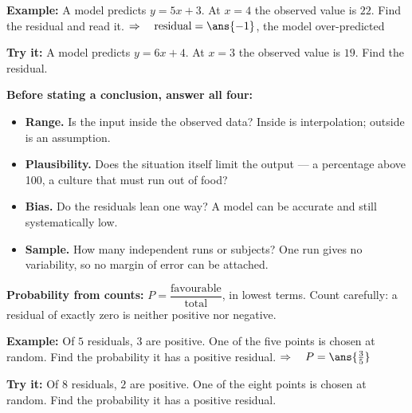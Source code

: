 \documentclass[12pt]{article}
\begin{document}
\begin{examplebox}
\textbf{Example:} \quad A model predicts $y = 5x + 3$. At $x = 4$ the observed value is
$22$. Find the residual and read it.
$\Rightarrow\quad \text{residual} = \ans{-1}$, the model over-predicted
\end{examplebox}

\begin{tryitbox}
\textbf{Try it:} \quad A model predicts $y = 6x + 4$. At $x = 3$ the observed value is
$19$. Find the residual.\\[2pt]
\end{tryitbox}


\begin{formulabox}
\textbf{Before stating a conclusion, answer all four:}
\begin{itemize}[label={$\bullet$}, leftmargin=1.1cm, itemsep=1pt, topsep=2pt]
  \item \textbf{Range.} Is the input inside the observed data? Inside is interpolation;
        outside is an assumption.
  \item \textbf{Plausibility.} Does the situation itself limit the output --- a percentage
        above 100, a culture that must run out of food?
  \item \textbf{Bias.} Do the residuals lean one way? A model can be accurate and still
        systematically low.
  \item \textbf{Sample.} How many independent runs or subjects? One run gives no
        variability, so no margin of error can be attached.
\end{itemize}
\textbf{Probability from counts:} $P = \dfrac{\text{favourable}}{\text{total}}$, in lowest
terms. Count carefully: a residual of exactly zero is neither positive nor negative.
\end{formulabox}

\begin{examplebox}
\textbf{Example:} \quad Of $5$ residuals, $3$ are positive. One of the five points is chosen
at random. Find the probability it has a positive residual.
$\Rightarrow\quad P = \ans{\tfrac{3}{5}}$
\end{examplebox}

\begin{tryitbox}
\textbf{Try it:} \quad Of $8$ residuals, $2$ are positive. One of the eight points is
chosen at random. Find the probability it has a positive residual.\\[2pt]
\end{tryitbox}
\end{document}
